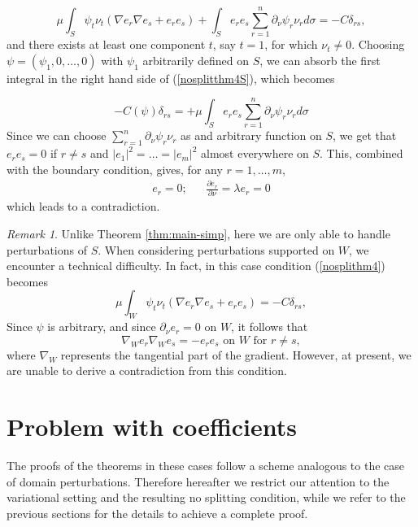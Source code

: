 \documentclass[a4paper,reqno,11pt,oneside]{amsart}
\theoremstyle{plain}
\theoremstyle{plain}
\theoremstyle{plain}
\theoremstyle{remark}
\newtheorem*{rem*}{Remark}
\begin{document}
\begin{equation}\label{nosplitthm4S}
  \mu  \int_{S}\psi_t \nu_t (\nabla e_r \nabla e_s +e_re_s)
 +\int_{S}  e_r e_s\sum_{r=1}^n \partial_\nu \psi_r \nu_rd\sigma  =-C \delta_{rs},    
    \end{equation}
and there exists at least one component $t$, say $t=1$, for which $\nu_t \neq 0$.
Choosing $\psi=(\psi_1,0,\dots,0)$ with $\psi_1$ arbitrarily defined on $S$, we can absorb the first integral in the right hand side of (\ref{nosplitthm4S}), which becomes

\begin{equation*}
    - C(\psi)\delta_{rs}=
     +\mu \int_{ S}  e_r  e_s\sum_{r=1}^n \partial_\nu \psi_r \nu_r d\sigma
\end{equation*}
Since we can choose $\sum_{r=1}^n \partial_\nu \psi_r \nu_r $ as and arbitrary function on $S$, we get that $ e_r  e_s=0$ if $r\neq s$ and $| e_1|^2=\dots=| e_m|^2$ almost everywhere on $S$. This, combined with the boundary condition, gives,  for any $r=1,\dots, m$,
\begin{eqnarray}
    e_r=0;&& \frac{\partial e_r}{\partial \nu}=\lambda e_r=0
\end{eqnarray}
which leads to a contradiction.

\begin{rem*}
    Unlike Theorem \ref{thm:main-simp}, here we are only able to handle perturbations of  $S$. When considering perturbations supported on $W$,  we encounter a technical difficulty. In fact, in this case condition  (\ref{nosplithm4}) becomes
\begin{equation}\label{thm4S}
  \mu  \int_{W}\psi_t \nu_t (\nabla e_r \nabla e_s +e_re_s) =-C \delta_{rs},    
    \end{equation}
Since $\psi$ is arbitrary, and since $\partial_\nu e_r=0$ on $W$, it follows that 
\begin{equation}\label{condHenry}
    \nabla_W e_r\nabla_W e_s =- e_re_s \text{ on }W \text{ for }r\neq s,
\end{equation}
where $\nabla_W$ represents the tangential part of the gradient.  However, at present, we are unable to derive a contradiction from this condition.
\end{rem*}

\section{Problem with coefficients}
The proofs of the theorems in these cases follow a scheme analogous to the case of domain perturbations. Therefore hereafter  we restrict our attention to the variational setting and the resulting no splitting condition, while we refer to the previous sections for the details to achieve a complete proof.
\end{document}
